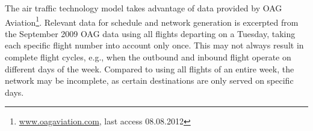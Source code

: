 The air traffic technology model takes advantage of data provided by OAG Aviation\footnote{\url{www.oagaviation.com}, last access 08.08.2012}. 
Relevant data for schedule and network generation is excerpted from the September 2009 OAG data using all flights departing on a Tuesday, taking each specific flight number into account only once.
This may not always result in complete flight cycles, e.g., when the outbound and inbound flight operate on different days of the week. 
Compared to using all flights of an entire week, the network may be incomplete, as certain destinations are only served on specific days.



